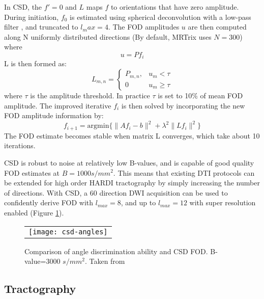 In CSD, the $f'=0$ and $L$ maps $f$ to orientations that have zero amplitude. During initiation, $f_0$ is estimated using spherical deconvolution with a low-pass filter \cite{Tournier2004}, and truncated to $l_max = 4$. The FOD amplitudes $u$ are then computed along N uniformly distributed directions (By default, MRTrix uses $N=300$) where
\begin{equation}
u = P f_i
\end{equation}
L is then formed as:
\begin{equation}
L_{m,n} = 
	\begin{cases}
		P_{m,n}, & u_m < \tau \\
		0 &	u_m \geq \tau 
	\end{cases}
\end{equation}
where $\tau$ is the amplitude threshold. In practice $\tau$ is set to 10\% of mean FOD amplitude. 
The improved iterative $f_i$ is then solved by incorporating the new FOD amplitude information by:
\begin{equation}
f_{i+1} = \text{argmin}\{ \|Af_i - b\|^2 + \lambda^2 \|L f_i\|^2  \}
\end{equation}
The FOD estimate becomes stable when matrix L converges, which take about 10 iterations. 

CSD is robust to noise at relatively low B-values, and is capable of good quality FOD estimates at $B=1000 s/mm^2$. This means that existing DTI protocols can be extended for high order HARDI tractography by simply increasing the number of directions. With CSD, a 60 direction DWI acquisition can be used to confidently derive FOD with $l_{max}=8 $, and up to $l_{max}=12$ with super resolution enabled \cite{Tournier2007b} (Figure \ref{fig:csd}). 

\begin{figure}[ht]
\begin{center}
\begin{tabular}{c}
\texttt{[image: csd-angles]}
\end{tabular}
\caption{ Comparison of angle discrimination ability and CSD FOD. B-value=3000 \protect $s/mm^2$. Taken from \protect \cite{Tournier2007b} } 
\label{fig:csd}
\end{center}
\end{figure}

\subsection{Tractography}

